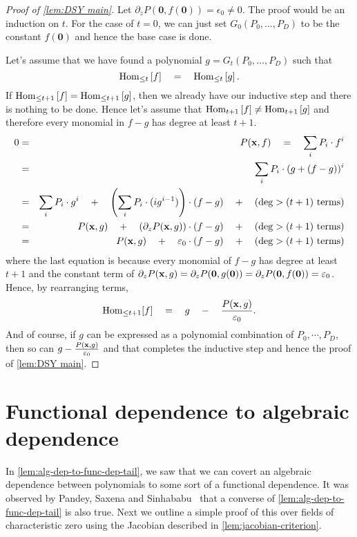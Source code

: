 \begin{proof}[Proof of \autoref{lem:DSY main}]
Let $\partial_zP(\mathbf{0}, f(\mathbf{0})) = \epsilon_0 \neq 0$. 
The proof would be an induction on $t$. For the case of $t = 0$, we can just set $G_0(P_0,\ldots, P_D)$ to be the constant $f(\mathbf{0})$ and hence the base case is done. 

\noindent
Let's assume that we have found a polynomial $g = G_t(P_0, \ldots, P_D)$ such that 
\[
\operatorname{Hom}_{\leq t}\left[f\right] \quad = \quad \operatorname{Hom}_{\leq t} \left[g\right]. 
\]
If $\operatorname{Hom}_{\leq t+1}\left[f\right]= \operatorname{Hom}_{\leq t+1} \left[g\right]$, then we already have our inductive step and there is nothing to be done.  Hence let's assume that $\operatorname{Hom}_{t+1}\left[f\right] \neq \operatorname{Hom}_{t+1}\left[g\right]$ and therefore every monomial in $f-g$ has degree at least $t+1$. 
\begin{eqnarray*}
0  & = &  P(\mathbf{x}, f) \quad = \quad \sum_i P_i \cdot f^i\\
   & = & \sum_i P_i \cdot (g + (f-g))^i\\
   & = & \sum_i P_i \cdot g^i \quad + \quad \left(\sum_i P_i \cdot (i g^{i-1})\right) \cdot (f-g) \quad + \quad (\text{$\deg > (t+1)$ terms})\\
   & = & P(\mathbf{x}, g) \quad + \quad \left(\partial_z P(\mathbf{x}, g)\right) \cdot (f-g) \quad + \quad (\text{$\deg > (t+1)$ terms})\\
   & = & P(\mathbf{x}, g) \quad + \quad \varepsilon_0 \cdot (f-g) \quad + \quad (\text{$\deg > (t+1)$ terms})
\end{eqnarray*}
where the last equation is because every monomial of $f-g$ has degree at least $t+1$ and the constant term of $\partial_zP(\mathbf{x}, g) = \partial_zP(\mathbf{0}, g(\mathbf{0})) =  \partial_zP(\mathbf{0}, f(\mathbf{0})) = \varepsilon_0$. Hence, by rearranging terms, 
\[
\operatorname{Hom}_{\leq t+1}[f] \quad = \quad g \quad - \quad \frac{P(\mathbf{x}, g)}{\varepsilon_0}.
\]
And of course, if $g$ can be expressed as a polynomial combination of $P_0,\cdots, P_D$, then so can $g - \frac{P(\mathbf{x}, g)}{\varepsilon_0}$ and that completes the inductive step and hence the proof of \autoref{lem:DSY main}. 
\end{proof}

\section{Functional dependence to algebraic dependence}

In \autoref{lem:alg-dep-to-func-dep-tail}, we saw that we can covert an algebraic dependence between polynomials to some sort of a functional dependence. It was observed by Pandey, Saxena and Sinhababu~\cite{PSS16} that a converse of \autoref{lem:alg-dep-to-func-dep-tail} is also true. Next we outline a simple proof of this over fields of characteristic zero using the Jacobian described in \autoref{lem:jacobian-criterion}. 

